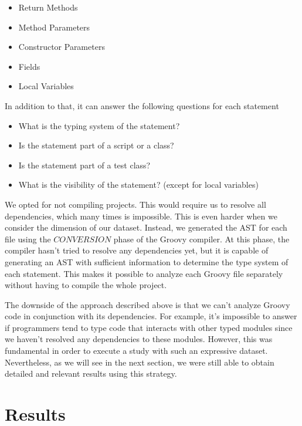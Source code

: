 \documentclass[preprint]{sigplanconf}
\begin{document}
\begin{itemize}
	\item Return Methods
	\item Method Parameters
	\item Constructor Parameters
	\item Fields
	\item Local Variables
\end{itemize}

In addition to that, it can answer the following questions for each statement
\begin{itemize}
	\item What is the typing system of the statement?
	\item Is the statement part of a script or a class?
	\item Is the statement part of a test class?
	\item What is the visibility of the statement? (except for local variables)
\end{itemize}


We opted for not compiling projects.
This would require us to resolve all dependencies, which many times is impossible.
This is even harder when we consider the dimension of our dataset.
Instead, we generated the AST for each file using the $CONVERSION$ phase of the Groovy compiler.
At this phase, the compiler hasn't tried to resolve any dependencies yet, but it is capable of generating an AST with sufficient information to determine the type system of each statement.
This makes it possible to analyze each Groovy file separately without having to compile the whole project.

The downside of the approach described above is that we can't analyze Groovy code in conjunction with its dependencies. 
For example, it's impossible to answer if programmers tend to type code that interacts with other typed modules since we haven't resolved any dependencies to these modules.
However, this was fundamental in order to execute a study with such an expressive dataset.
Nevertheless, as we will see in the next section, we were still able to obtain detailed and relevant results using this strategy.











%
%
\section{Results\label{sec:Resultados}}
\end{document}
